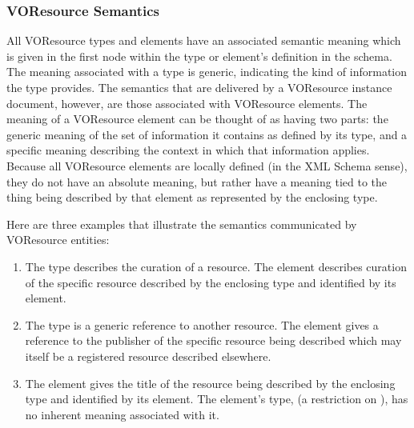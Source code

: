 \documentclass[11pt,a4paper]{ivoa}
\begin{document}

\subsubsection{VOResource Semantics}

All VOResource types and elements have an associated semantic meaning
which is given in the first 
node within the type or element's definition in the schema.  The
meaning associated with a type is generic, indicating the kind of
information the type provides.  The semantics that are delivered by a
VOResource instance document, however, are those associated with
VOResource elements.  The meaning of a VOResource element can be
thought of as having two parts:  the generic meaning of the set of
information it contains as defined by its type, and a specific meaning
describing the context in which that information applies.  Because all
VOResource elements are locally defined (in the XML Schema
sense), they do not have an absolute meaning, but rather have a
meaning tied to the thing being described by that element as
represented by the enclosing type.  

Here are three examples that illustrate the semantics communicated by
VOResource entities:

\begin{enumerate}
\item The  type describes the curation of a
       resource.  The  element
       describes curation of the specific resource described by the
       enclosing  type and identified by its
        element. 

  \item The  type is a generic reference to
       another resource.  The  element
       gives a reference to the publisher of the specific resource being
       described which may itself be a registered resource described
       elsewhere.  

  \item The  element gives the title of
       the resource being described by the enclosing
        type and identified by its
        element.  The
        element's type,
        (a restriction on
       ), has no inherent meaning associated
       with it.   
\end{enumerate}
\end{document}

